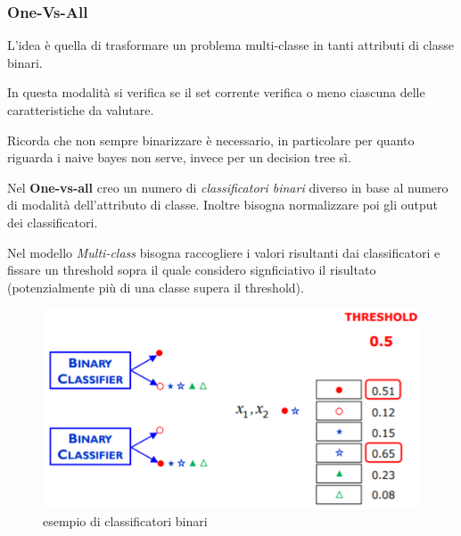 \subsubsection{One-Vs-All}
L'idea \`e quella di trasformare un problema multi-classe in tanti attributi di classe binari. 

In questa modalit\`a si verifica se il set corrente verifica o meno ciascuna delle caratteristiche da valutare. 

Ricorda che non sempre binarizzare \`e necessario, in particolare per quanto riguarda i naive bayes non serve, invece per un decision tree s\`i. 

Nel \textbf{One-vs-all} creo un numero di \textit{classificatori binari} diverso in base al numero di modalit\`a dell'attributo di classe. Inoltre bisogna normalizzare poi gli output dei classificatori. 

Nel modello \textit{Multi-class} bisogna raccogliere i valori risultanti dai classificatori e fissare un threshold sopra il quale considero signficiativo il risultato (potenzialmente pi\`u di una classe supera il threshold).
\begin{figure}[H]
	\centering
	\includegraphics[height=0.4 \linewidth]{classification/pict/es_no_binary_classification.png}
	\caption{esempio di classificatori binari}
\end{figure} 
